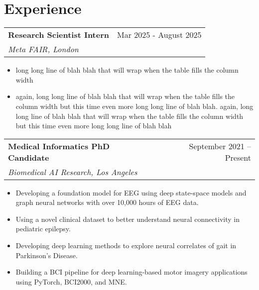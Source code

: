 
\newenvironment{jobshort}[4]{%
  \begin{tabularx}{\linewidth}{@{}X r@{}}
    \textbf{#1} & #4 \\[-1pt]
    \textit{#2, #3} & \\[3pt]
  \end{tabularx}
}{}

\newenvironment{joblong}[4]{%
  \begin{tabularx}{\linewidth}{@{}X r@{}}
    \textbf{#1} & #4 \\[-1pt]
    \textit{#2, #3} & \\[3pt]
  \end{tabularx}
  \begin{itemize}[leftmargin=1em, label=--,
                  topsep=2pt, partopsep=0pt, parsep=0pt, itemsep=3pt]
}{%
  \end{itemize}
}


\section*{Experience}

\begin{joblong}{Research Scientist Intern}{Meta FAIR}{London}{Mar 2025 - August 2025}
\item long long line of blah blah that will wrap when the table fills the column width
\item again, long long line of blah blah that will wrap when the table fills the column width but this time even more long long line of blah blah. again, long long line of blah blah that will wrap when the table fills the column width but this time even more long long line of blah blah
\end{joblong}


\begin{joblong}{Medical Informatics PhD Candidate}{Biomedical AI Research}{Los Angeles}{September 2021 -- Present}
    \item Developing a foundation model for EEG using deep state-space models and graph neural networks with over 10,000 hours of EEG data.
    \item Using a novel clinical dataset to better understand neural connectivity in pediatric epilepsy.
    \item Developing deep learning methods to explore neural correlates of gait in Parkinson’s Disease.
    \item Building a BCI pipeline for deep learning-based motor imagery applications using PyTorch, BCI2000, and MNE.
\end{joblong}

